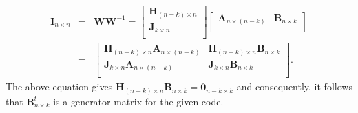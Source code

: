 \documentclass[journal,draftclsnofoot,onecolumn,12pt,twoside]{IEEEtran}
\begin{document}
\begin{eqnarray*}
  \mathbf{I}_{n\times n}&=&\mathbf{WW}^{-1}=\left[
                          \begin{array}{c}
                            \mathbf{H}_{(n-k)\times n} \\
                            \mathbf{J}_{k\times n}\\
                          \end{array}
                        \right]\left[
                                 \begin{array}{cc}
                                   \mathbf{A}_{n\times(n-k)} & \mathbf{B}_{n\times k} \\
                                 \end{array}
                               \right] \\
   &=& \left[
         \begin{array}{cc}
           \mathbf{H}_{(n-k)\times n}\mathbf{A}_{n\times(n-k)}  & \mathbf{H}_{(n-k)\times n}\mathbf{B}_{n\times k}  \\
           \mathbf{J}_{k\times n}\mathbf{A}_{n\times(n-k)} & \mathbf{J}_{k\times n}\mathbf{B}_{n\times k} \\
         \end{array}
       \right].
\end{eqnarray*}
The above equation gives $\mathbf{H}_{(n-k)\times n}\mathbf{B}_{n\times k}=\mathbf{0}_{n-k\times k}$ and consequently, it follows that  $\mathbf{B}_{n\times k}^t$ is a generator matrix for the given code.
\end{document}
